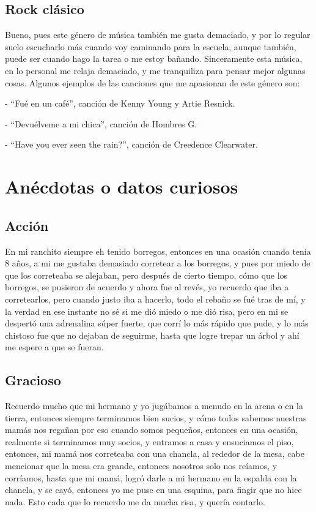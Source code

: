 \documentclass[letterpaper,12pt]{article}
\begin{document}
    \subsection{\Large{Rock clásico}} \large{Bueno, pues este género de música también me gusta demaciado, y por lo regular suelo escucharlo más cuando voy caminando para la escuela, aunque también, puede ser cuando hago la tarea o me estoy bañando. Sinceramente esta música, en lo personal me relaja demaciado, y me tranquiliza para pensar mejor algunas cosas. Algunos ejemplos de las canciones que me apasionan de este género son:
    
    - ``Fué en un café'', canción de Kenny Young y Artie Resnick.
    
    - ``Devuélveme a mi chica'', canción de Hombres G.
    
    - ``Have you ever seen the rain?'', canción de Creedence Clearwater.}
    
\section{\huge{Anécdotas o datos curiosos}} 
    \subsection{\Large{Acción}} \large{En mi ranchito siempre eh tenido borregos, entonces en una ocasión cuando tenía 8 años, a mi me gustaba demasiado corretear a los borregos, y pues por miedo de que los correteaba se alejaban, pero después de cierto tiempo, cómo que los borregos, se pusieron de acuerdo y ahora fue al revés, yo recuerdo que iba a corretearlos, pero cuando justo iba a hacerlo, todo el rebaño se fué tras de mí, y la verdad en ese instante no sé si me dió miedo o me dió risa, pero en mi se despertó una adrenalina súper fuerte, que corrí lo más rápido que pude, y lo más chistoso fue que no dejaban de seguirme, hasta que logre trepar un árbol y ahí me espere a que se fueran.}

    \subsection{\Large{Gracioso}} \large{Recuerdo mucho que mi hermano y yo jugábamos a menudo en la arena o en la tierra, entonces siempre terminamos bien sucios, y cómo todos sabemos nuestras mamás nos regañan por eso cuando somos pequeños, entonces en una ocasión, realmente si terminamos muy socios, y entramos a casa y ensuciamos el piso, entonces, mi mamá nos correteaba con una chancla, al rededor de la mesa, cabe mencionar que la mesa era grande, entonces nosotros solo nos reíamos, y corríamos, hasta que mi mamá, logró darle a mi hermano en la espalda con la chancla, y se cayó, entonces yo me puse en una esquina, para fingir que no hice nada. Esto cada que lo recuerdo me da mucha risa, y quería contarlo.}
    
\end{document}
